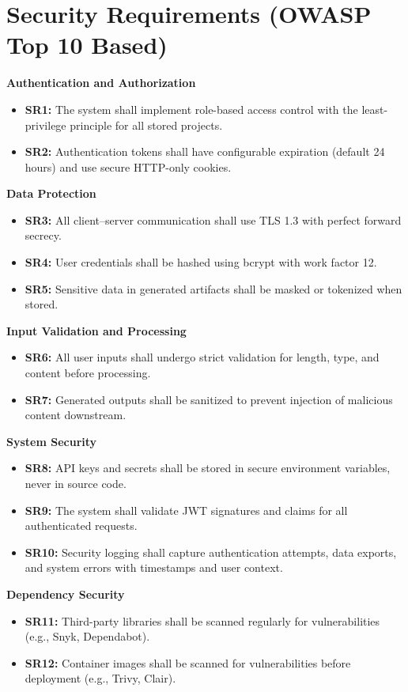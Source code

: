 \documentclass[12pt,a4paper,oneside]{report}
\begin{document}
\section{Security Requirements (OWASP Top 10 Based)}
\textbf{Authentication and Authorization}
\begin{itemize}[leftmargin=*,nosep]
  \item \textbf{SR1:} The system shall implement role-based access control with the least-privilege principle for all stored projects.
  \item \textbf{SR2:} Authentication tokens shall have configurable expiration (default 24 hours) and use secure HTTP-only cookies.
\end{itemize}
\textbf{Data Protection}
\begin{itemize}[leftmargin=*,nosep]
  \item \textbf{SR3:} All client--server communication shall use TLS 1.3 with perfect forward secrecy.
  \item \textbf{SR4:} User credentials shall be hashed using bcrypt with work factor 12.
  \item \textbf{SR5:} Sensitive data in generated artifacts shall be masked or tokenized when stored.
\end{itemize}
\textbf{Input Validation and Processing}
\begin{itemize}[leftmargin=*,nosep]
  \item \textbf{SR6:} All user inputs shall undergo strict validation for length, type, and content before processing.
  \item \textbf{SR7:} Generated outputs shall be sanitized to prevent injection of malicious content downstream.
\end{itemize}
\textbf{System Security}
\begin{itemize}[leftmargin=*,nosep]
  \item \textbf{SR8:} API keys and secrets shall be stored in secure environment variables, never in source code.
  \item \textbf{SR9:} The system shall validate JWT signatures and claims for all authenticated requests.
  \item \textbf{SR10:} Security logging shall capture authentication attempts, data exports, and system errors with timestamps and user context.
\end{itemize}
\textbf{Dependency Security}
\begin{itemize}[leftmargin=*,nosep]
  \item \textbf{SR11:} Third-party libraries shall be scanned regularly for vulnerabilities (e.g., Snyk, Dependabot).
  \item \textbf{SR12:} Container images shall be scanned for vulnerabilities before deployment (e.g., Trivy, Clair).
\end{itemize}
\end{document}
